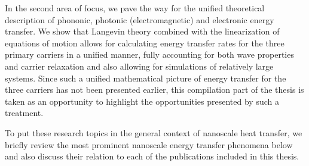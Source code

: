 
In the second area of focus, we pave the way for the unified theoretical description of phononic, photonic (electromagnetic) and electronic energy transfer. We show that Langevin theory \cite{langevin,zwanzig} combined with the linearization of equations of motion allows for calculating energy transfer rates for the three primary carriers in a unified manner, fully accounting for both wave properties and carrier relaxation and also allowing for simulations of relatively large systems. Since such a unified mathematical picture of energy transfer for the three carriers has not been presented earlier, this compilation part of the thesis is taken as an opportunity to highlight the opportunities presented by such a treatment.

To put these research topics in the general context of nanoscale heat transfer, we briefly review the most prominent nanoscale energy transfer phenomena below and also discuss their relation to each of the publications included in this thesis. 


